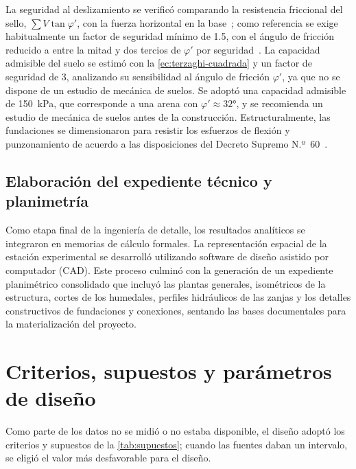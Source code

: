 La seguridad al deslizamiento se verificó comparando la resistencia friccional del sello, $\sum V \tan\varphi'$, con la fuerza horizontal en la base~\parencite{inn2025nch2369}; como referencia se exige habitualmente un factor de seguridad mínimo de \num{1.5}, con el ángulo de fricción reducido a entre la mitad y dos tercios de $\varphi'$ por seguridad~\parencite{das2015fundamentos}.
La capacidad admisible del suelo se estimó con la \cref{ec:terzaghi-cuadrada} y un factor de seguridad de 3, analizando su sensibilidad al ángulo de fricción $\varphi'$, ya que no se dispone de un estudio de mecánica de suelos.
Se adoptó una capacidad admisible de \qty{150}{\kilo\pascal}, que corresponde a una arena con $\varphi' \approx \ang{32}$, y se recomienda un estudio de mecánica de suelos antes de la construcción.
Estructuralmente, las fundaciones se dimensionaron para resistir los esfuerzos de flexión y punzonamiento de acuerdo a las disposiciones del Decreto Supremo N.º~60~\parencite{minvu2011ds60}.

\subsection{Elaboración del expediente técnico y planimetría}

Como etapa final de la ingeniería de detalle, los resultados analíticos se integraron en memorias de cálculo formales.
La representación espacial de la estación experimental se desarrolló utilizando software de diseño asistido por computador (CAD).
Este proceso culminó con la generación de un expediente planimétrico consolidado que incluyó las plantas generales, isométricos de la estructura, cortes de los humedales, perfiles hidráulicos de las zanjas y los detalles constructivos de fundaciones y conexiones, sentando las bases documentales para la materialización del proyecto.

\section{Criterios, supuestos y parámetros de diseño}
\label{sec:met-supuestos}

Como parte de los datos no se midió o no estaba disponible, el diseño adoptó los criterios y supuestos de la \cref{tab:supuestos}; cuando las fuentes daban un intervalo, se eligió el valor más desfavorable para el diseño.

